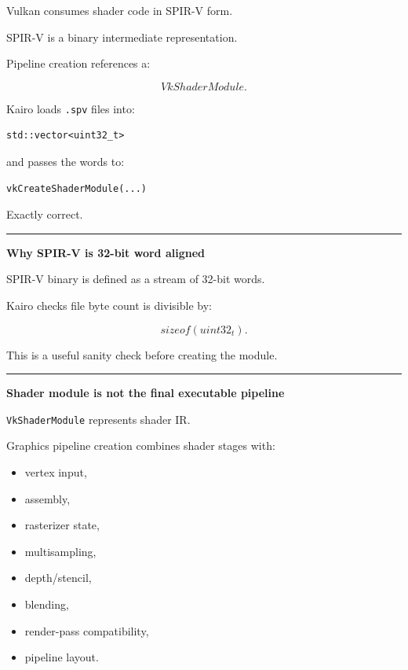 Vulkan consumes shader code in SPIR-V form.

SPIR-V is a binary intermediate representation.

Pipeline creation references a:

\[
VkShaderModule.
\]

Kairo loads \texttt{.spv} files into:

\begin{verbatim}
std::vector<uint32_t>
\end{verbatim}

and passes the words to:

\begin{verbatim}
vkCreateShaderModule(...)
\end{verbatim}

Exactly correct.

\begin{center}\rule{0.5\linewidth}{0.5pt}\end{center}

\textbf{Why SPIR-V is 32-bit word aligned}

SPIR-V binary is defined as a stream of 32-bit words.

Kairo checks file byte count is divisible by:

\[
sizeof(uint32_t).
\]

This is a useful sanity check before creating the module.

\begin{center}\rule{0.5\linewidth}{0.5pt}\end{center}

\textbf{Shader module is not the final executable pipeline}

\texttt{VkShaderModule} represents shader IR.

Graphics pipeline creation combines shader stages with:

\begin{itemize}
\tightlist
\item
  vertex input,
\item
  assembly,
\item
  rasterizer state,
\item
  multisampling,
\item
  depth/stencil,
\item
  blending,
\item
  render-pass compatibility,
\item
  pipeline layout.
\end{itemize}

